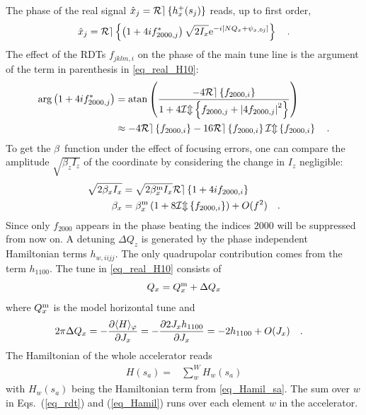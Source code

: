 The phase of the real signal $\hat{x}_j = \mathcal{Re} \left\{ h_x^+(s_j) \right\}$ reads,
up to first order,
%
\begin{equation}
    \hat{x}_j = \mathcal{Re} \left\{ \left( 1+4if_{2000,j}^* \right) \sqrt{2I_x}\text{e}^{-i[ N Q_x+\psi_{x,0j}]} \right\}
  \quad .
  \label{eq_real_H10}
\end{equation}
%
The effect of the RDTs $f_{jklm,i}$ on the phase of the main tune
line is the argument of the term in parenthesis in \eqref{eq_real_H10}:
%
\begin{align}
 \arg\left( 1+4if_{2000,j}^* \right)
  &=   \mathrm{atan} \left(
   \frac{
     -4\mathcal{Re} \left\{  f_{2000,i} \right\}
   }{
     1 +4\mathcal{Im} \left\{ f_{2000,j} + \left| 4 f_{2000,j}\right|^2  \right\}
   } \right) \notag \\
  &\approx  -4 \mathcal{Re} \left\{ f_{2000,i} \right\} - 16 \mathcal{Re} \left\{ f_{2000,i} \right\}\mathcal{Im} \left\{ f_{2000,i} \right\}
 \quad .
\label{eq_thetaH}
\end{align}
%
To get the $\beta$~function under the effect of focusing errors, one can compare the amplitude
$\sqrt{\beta_zI_z}$ of the coordinate by considering the change in $I_z$ negligible:
%
\begin{align}
    \sqrt{2\beta_xI_x} &= \sqrt{2\beta_x^\text{m} I_x}\mathcal{Re} \left\{  1 + 4if_{2000,i} \right\} \notag \\
    \beta_x &= \beta_x^\text{m} \left( 1 + 8\mathcal{Im} \left\{ f_{2000,i} \right\}\right) + O(f^2)
    \quad .
    \label{eq_betabeat}
\end{align}
%
Since only $f_{2000}$ appears in the phase beating the indices $2000$ will be suppressed from now on.
A detuning $\Delta Q_z$ is generated by the phase independent Hamiltonian terms $h_{w, iijj}$.
The only quadrupolar contribution comes from the term
$h_{1100}$.
The tune in \eqref{eq_real_H10} consists of
%
\begin{equation}
  \label{eq_tune_dshift}
  Q_x = Q_{x}^\text{m} + \Delta Q_x
\end{equation}
%
where $Q_{x}^\text{m}$ is the model horizontal tune and
%
\begin{align}
  2\pi\Delta Q_x &= -\frac{\partial \langle H \rangle_\varphi}{\partial J_x}
  = -\frac{\partial 2 J_x
    h_{1100}}{\partial J_x} = -2h_{1100} + O(J_x) 
    \quad . 
  \label{eq_tune_shift_h1100}
\end{align}
%
The Hamiltonian of the whole accelerator reads
%
\begin{align}
  H(s_a) =& \sum\limits_{w}^{W} H_w(s_a)
  \label{eq_Hamil}
\end{align}
%
with $H_w(s_a)$ being the Hamiltonian term from \eqref{eq_Hamil_sa}.
The sum over $w$ in Eqs.~(\ref{eq_rdt}) and (\ref{eq_Hamil}) runs over each element $w$ in the accelerator.
